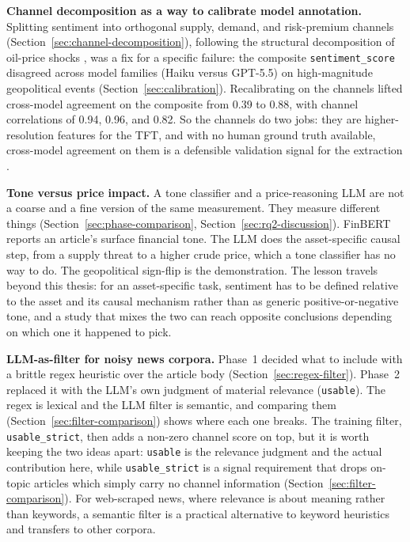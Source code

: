 \textbf{Channel decomposition as a way to calibrate model annotation.} Splitting sentiment into orthogonal supply, demand, and risk-premium channels (Section~\ref{sec:channel-decomposition}), following the structural decomposition of oil-price shocks \citep{kilian2009}, was a fix for a specific failure: the composite \texttt{sentiment\_score} disagreed across model families (Haiku versus GPT-5.5) on high-magnitude geopolitical events (Section~\ref{sec:calibration}). Recalibrating on the channels lifted cross-model agreement on the composite from 0.39 to 0.88, with channel correlations of 0.94, 0.96, and 0.82. So the channels do two jobs: they are higher-resolution features for the TFT, and with no human ground truth available, cross-model agreement on them is a defensible validation signal for the extraction \citep{gilardi2023, zheng2023}.

\textbf{Tone versus price impact.} A tone classifier and a price-reasoning LLM are not a coarse and a fine version of the same measurement. They measure different things (Section~\ref{sec:phase-comparison}, Section~\ref{sec:rq2-discussion}). FinBERT reports an article's surface financial tone. The LLM does the asset-specific causal step, from a supply threat to a higher crude price, which a tone classifier has no way to do. The geopolitical sign-flip is the demonstration. The lesson travels beyond this thesis: for an asset-specific task, sentiment has to be defined relative to the asset and its causal mechanism rather than as generic positive-or-negative tone, and a study that mixes the two can reach opposite conclusions depending on which one it happened to pick.

\textbf{LLM-as-filter for noisy news corpora.} Phase~1 decided what to include with a brittle regex heuristic over the article body (Section~\ref{sec:regex-filter}). Phase~2 replaced it with the LLM's own judgment of material relevance (\texttt{usable}). The regex is lexical and the LLM filter is semantic, and comparing them (Section~\ref{sec:filter-comparison}) shows where each one breaks. The training filter, \texttt{usable\_strict}, then adds a non-zero channel score on top, but it is worth keeping the two ideas apart: \texttt{usable} is the relevance judgment and the actual contribution here, while \texttt{usable\_strict} is a signal requirement that drops on-topic articles which simply carry no channel information (Section~\ref{sec:filter-comparison}). For web-scraped news, where relevance is about meaning rather than keywords, a semantic filter is a practical alternative to keyword heuristics and transfers to other corpora.

